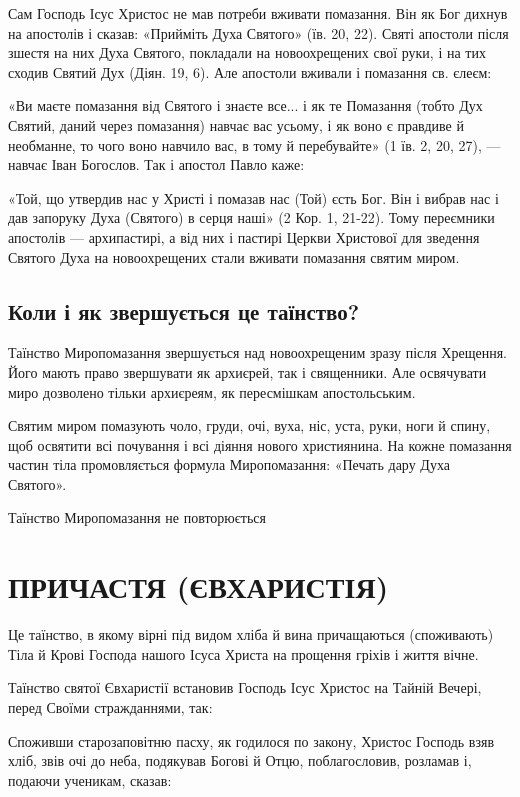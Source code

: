 \documentclass[main.tex]{subfiles}
\begin{document}
Сам Господь Ісус Христос не мав потреби вживати помазання. Він як Бог дихнув на апостолів і сказав: «Прийміть Духа Святого» (їв. 20, 22).
Святі апостоли після зшестя на них Духа Святого, покладали на новоохрещених свої руки, і на тих сходив Святий Дух (Діян. 19, 6). Але апостоли вживали і помазання св. єлеєм:

«Ви маєте помазання від Святого і знаєте все... і як те Помазання (тобто Дух Святий, даний через помазання) навчає вас усьому, і як воно є правдиве й необманне, то чого воно навчило вас, в тому й перебувайте» (1 їв. 2, 20, 27), — навчає Іван Богослов. Так і апостол Павло каже:

«Той, що утвердив нас у Христі і помазав нас (Той) єсть Бог. Він і вибрав нас і дав запоруку Духа (Святого) в серця наші» (2 Кор. 1, 21-22).
Тому переємники апостолів — архипастирі, а від них і пастирі Церкви Христової для зведення Святого Духа на новоохрещених стали вживати помазання святим миром.

\subsection{Коли і як звершується це таїнство?}

Таїнство Миропомазання звершується над новоохрещеним зразу після Хрещення. Його мають право звершувати як архиєрей, так і священники. Але освячувати миро дозволено тільки архиєреям, як пересмішкам апостольським.

Святим миром помазують чоло, груди, очі, вуха, ніс, уста, руки, ноги й спину, щоб освятити всі почування і всі діяння нового християнина. На кожне помазання частин тіла промовляється формула Миропомазання: «Печать дару Духа Святого».

Таїнство Миропомазання не повторюється

\section{ПРИЧАСТЯ (ЄВХАРИСТІЯ)}

Це таїнство, в якому вірні під видом хліба й вина причащаються (споживають) Тіла й Крові Господа нашого Ісуса Христа на прощення гріхів і життя вічне.

Таїнство святої Євхаристії встановив Господь Ісус Христос на Тайній Вечері, перед Своїми стражданнями, так:

Споживши старозаповітню пасху, як годилося по закону, Христос Господь взяв хліб, звів очі до неба, подякував Богові й Отцю, поблагословив, розламав і, подаючи ученикам, сказав:
\end{document}
